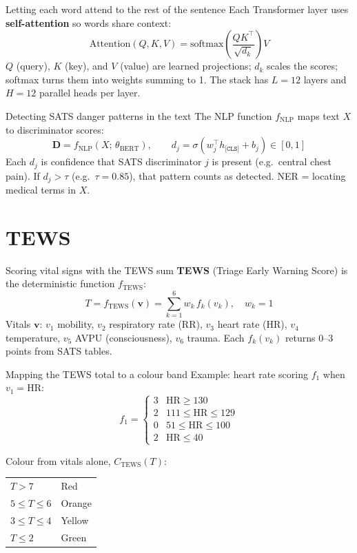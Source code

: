 \documentclass[aspectratio=169,11pt]{beamer}
\newcommand{\bcol}[2][blue!70!black]{\textcolor{#1}{#2}}
\begin{document}
\begin{frame}{Letting each word attend to the rest of the sentence}
	Each Transformer layer uses \textbf{self-attention} so words share context:
	\[
	\mathrm{Attention}(Q,K,V) = \mathrm{softmax}\!\left(\frac{QK^\top}{\sqrt{d_k}}\right) V
	\]
	$Q$ (query), $K$ (key), and $V$ (value) are learned projections; $d_k$ scales the scores; softmax turns them into weights summing to 1. The stack has $L=12$ layers and $H=12$ parallel heads per layer.
\end{frame}

\begin{frame}{Detecting SATS danger patterns in the text}
	The NLP function $f_{\text{NLP}}$ maps text $X$ to discriminator scores:
	\[
	\mathbf{D} = f_{\text{NLP}}(X;\,\theta_{\text{BERT}}), \qquad
	d_j = \sigma(w_j^\top h_{\texttt{[CLS]}} + b_j) \in [0,1]
	\]
	Each $d_j$ is confidence that SATS discriminator $j$ is present (e.g.\ central chest pain). If $d_j > \tau$ (e.g.\ $\tau=0.85$), that pattern counts as detected. NER = locating medical terms in $X$.
\end{frame}

\section{TEWS}

\begin{frame}{Scoring vital signs with the TEWS sum}
	\textbf{TEWS} (Triage Early Warning Score) is the deterministic function $f_{\text{TEWS}}$:
	\[
	T = f_{\text{TEWS}}(\mathbf{v}) = \sum_{k=1}^{6} w_k\, f_k(v_k), \quad w_k=1
	\]
	Vitals $\mathbf{v}$: $v_1$ mobility, $v_2$ respiratory rate (RR), $v_3$ heart rate (HR), $v_4$ temperature, $v_5$ AVPU (consciousness), $v_6$ trauma. Each $f_k(v_k)$ returns 0--3 points from SATS tables.
\end{frame}

\begin{frame}{Mapping the TEWS total to a colour band}
	Example: heart rate scoring $f_1$ when $v_1=\mathrm{HR}$:
	\small
	\[
	f_1 = \begin{cases}
		3 & \mathrm{HR} \geq 130 \\
		2 & 111 \leq \mathrm{HR} \leq 129 \\
		0 & 51 \leq \mathrm{HR} \leq 100 \\
		2 & \mathrm{HR} \leq 40
	\end{cases}
	\]

	Colour from vitals alone, $C_{\text{TEWS}}(T)$:
	\footnotesize
	\begin{tabular}{@{}ll@{}}
		$T > 7$ & \bcol[triageRed]{Red} \\
		$5 \leq T \leq 6$ & \bcol[triageOrange]{Orange} \\
		$3 \leq T \leq 4$ & \bcol[triageYellow]{Yellow} \\
		$T \leq 2$ & \bcol[triageGreen]{Green}
	\end{tabular}
\end{frame}
\end{document}
